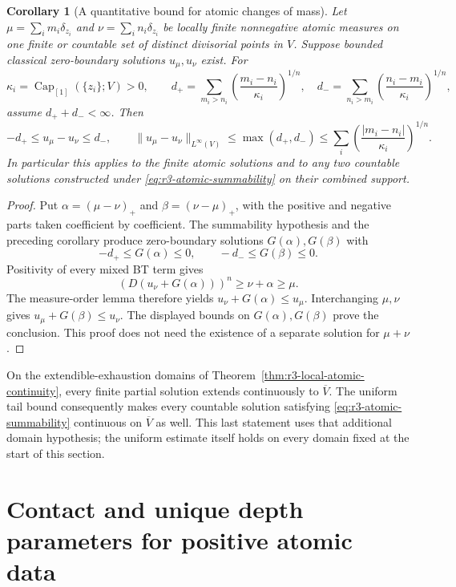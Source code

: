 \documentclass[11pt,a4paper]{article}
\numberwithin{equation}{section}
\newtheorem{corollary}[theorem]{Corollary}
\theoremstyle{definition}
\theoremstyle{remark}
\begin{document}
\begin{corollary}[A quantitative bound for atomic changes of mass]
\label{cor:r3-atomic-quantitative-stability}
Let $\mu=\sum_i m_i\delta_{z_i}$ and
$\nu=\sum_i n_i\delta_{z_i}$ be locally finite nonnegative atomic
measures on one finite or countable set of distinct divisorial
points in $V$. Suppose bounded classical zero-boundary solutions
$u_\mu,u_\nu$ exist. For
\[
 \kappa_i=\operatorname{Cap}_{[1]}(\{z_i\};V)>0,
 \qquad
 d_+=\sum_{m_i>n_i}\left(\frac{m_i-n_i}{\kappa_i}\right)^{1/n},
 \quad
 d_-=\sum_{n_i>m_i}\left(\frac{n_i-m_i}{\kappa_i}\right)^{1/n},
\]
assume $d_++d_-<\infty$. Then
\[
 -d_+\leq u_\mu-u_\nu\leq d_-,
 \qquad
 \|u_\mu-u_\nu\|_{L^\infty(V)}
       \leq\max(d_+,d_-)
       \leq\sum_i\left(\frac{|m_i-n_i|}{\kappa_i}\right)^{1/n}.
 \tag{9}\label{eq:r3-atomic-stability-bound}
\]
In particular this applies to the finite atomic solutions and to
any two countable solutions constructed under
\eqref{eq:r3-atomic-summability} on their combined support.
\end{corollary}

\begin{proof}
Put $\alpha=(\mu-\nu)_+$ and $\beta=(\nu-\mu)_+$, with
the positive and negative parts taken coefficient by coefficient.
The summability hypothesis and the preceding corollary produce
zero-boundary solutions $G(\alpha),G(\beta)$ with
\[
 -d_+\leq G(\alpha)\leq0,
 \qquad -d_-\leq G(\beta)\leq0.
\]
Positivity of every mixed BT term gives
\[
 (D(u_\nu+G(\alpha)))^n\geq\nu+\alpha\geq\mu.
\]
The measure-order lemma therefore yields
$u_\nu+G(\alpha)\leq u_\mu$. Interchanging $\mu,\nu$
gives $u_\mu+G(\beta)\leq u_\nu$. The displayed bounds
on $G(\alpha),G(\beta)$ prove the conclusion. This proof does
not need the existence of a separate solution for $\mu+\nu$.
\end{proof}

On the extendible-exhaustion domains of
Theorem~\ref{thm:r3-local-atomic-continuity}, every finite partial
solution extends continuously to $\overline V$. The uniform
tail bound consequently makes every countable solution satisfying
\eqref{eq:r3-atomic-summability} continuous on $\overline V$
as well. This last statement uses that additional domain hypothesis;
the uniform estimate itself holds on every domain fixed at the
start of this section.



\section{Contact and unique depth parameters for positive atomic data}
\label{sec:r3-atomic-contact}
\end{document}
